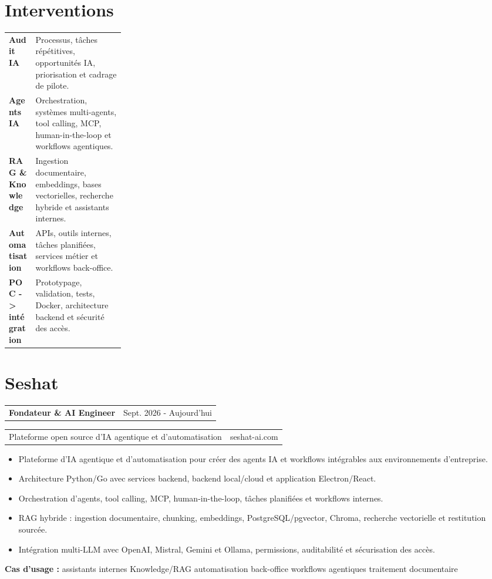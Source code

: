 \documentclass[10pt,a4paper]{article}
\makeatletter
\newcommand{\cvrole}[4]{%
  \vspace{4.2pt}
  \begin{tabularx}{\linewidth}{@{}Xr@{}}
    \textbf{#1} & {\color{accent}#2}
  \end{tabularx}\par\vspace{-4.6pt}
  \begin{tabularx}{\linewidth}{@{}Xr@{}}
    {\color{muted}#3} & {\color{muted}#4}
  \end{tabularx}\par\vspace{-0.4pt}
}
\newcommand{\skillrow}[2]{%
  \textbf{#1} & #2\\
}
\makeatother
\begin{document}
\section{Interventions}
\begin{tabularx}{\linewidth}{@{}>{\raggedright\arraybackslash}p{0.23\linewidth}>{\raggedright\arraybackslash}X@{}}
\skillrow{Audit IA}{Processus, tâches répétitives, opportunités IA, priorisation et cadrage de pilote.}
\skillrow{Agents IA}{Orchestration, systèmes multi-agents, tool calling, MCP, human-in-the-loop et workflows agentiques.}
\skillrow{RAG \& Knowledge}{Ingestion documentaire, embeddings, bases vectorielles, recherche hybride et assistants internes.}
\skillrow{Automatisation}{APIs, outils internes, tâches planifiées, services métier et workflows back-office.}
\skillrow{POC -> intégration}{Prototypage, validation, tests, Docker, architecture backend et sécurité des accès.}
\end{tabularx}

\section{Seshat}
\cvrole{Fondateur \& AI Engineer}{Sept. 2026 - Aujourd'hui}{Plateforme open source d'IA agentique et d'automatisation}{seshat-ai.com}
\begin{itemize}
  \item Plateforme d'IA agentique et d'automatisation pour créer des agents IA et workflows intégrables aux environnements d'entreprise.
  \item Architecture Python/Go avec services backend, backend local/cloud et application Electron/React.
  \item Orchestration d'agents, tool calling, MCP, human-in-the-loop, tâches planifiées et workflows internes.
  \item RAG hybride : ingestion documentaire, chunking, embeddings, PostgreSQL/pgvector, Chroma, recherche vectorielle et restitution sourcée.
  \item Intégration multi-LLM avec OpenAI, Mistral, Gemini et Ollama, permissions, auditabilité et sécurisation des accès.
\end{itemize}
{\small\textbf{Cas d'usage :} assistants internes \textbullet{} Knowledge/RAG \textbullet{} automatisation back-office \textbullet{} workflows agentiques \textbullet{} traitement documentaire}
\end{document}
